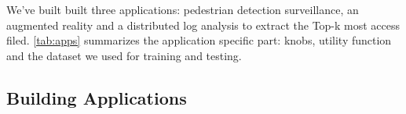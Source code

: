 



 We've built built three applications: pedestrian detection surveillance, an
augmented reality and a distributed log analysis to extract the Top-k most
access filed. \autoref{tab:apps} summarizes the application specific part:
knobs, utility function and the dataset we used for training and testing.


\subsection{Building Applications}
\label{sec:build-appl}

